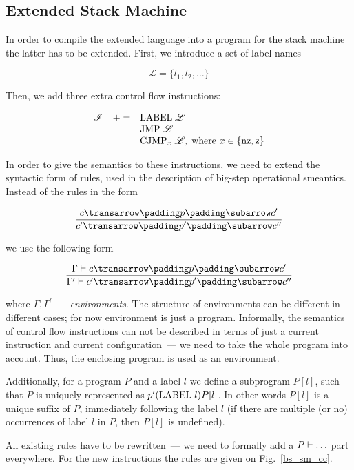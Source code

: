 \subsection{Extended Stack Machine}

In order to compile the extended language into a program for the stack machine the latter has to be extended. First, we introduce a set of label names

\[
\mathscr L = \{l_1, l_2, \dots\}
\]

Then, we add three extra control flow instructions:

\[
\begin{array}{rcl}
  \mathscr I & += & \llang{LABEL $\;\mathscr L$} \\
             &   & \llang{JMP $\;\mathscr L$} \\
  &   & \llang{CJMP$_x$ $\;\mathscr L$},\;\mbox{where $x\in\{\llang{nz}, \llang{z}\}$}
\end{array}
\]

In order to give the semantics to these instructions, we need to extend the syntactic form of rules, used in the description of big-step operational smeantics. Instead of
the rules in the form

\setarrow{\xRightarrow}

\[
\trule{\trans{c}{p}{c^\prime}}{\trans{c^\prime}{p^\prime}{c^{\prime\prime}}}
\]

we use the following form

\[
\trule{\withenv{\Gamma}{\trans{c}{p}{c^\prime}}}{\withenv{\Gamma^\prime}{\trans{c^\prime}{p^\prime}{c^{\prime\prime}}}}
\]

where $\Gamma, \Gamma^\prime$~--- \emph{environments}. The structure of environments can be different in different cases; for now environment is just a program. Informally,
the semantics of control flow instructions can not be described in terms of just a current instruction and current configuration~--- we need to take the whole
program into account. Thus, the enclosing program is used as an environment.

Additionally, for a program $P$ and a label $l$ we define a subprogram $P[l]$, such that $P$ is uniquely represented as $p^\prime(\llang{LABEL $\;l$})P[l]$.
In other words $P[l]$ is a unique suffix of $P$, immediately following the label $l$ (if there are multiple (or no) occurrences of label $l$ in $P$, then $P[l]$ is
undefined).

All existing rules have to be rewritten~--- we need to formally add a ${P}\vdash{\dots}$ part everywhere. For the new instructions the rules are given on Fig.~\ref{bs_sm_cc}.

